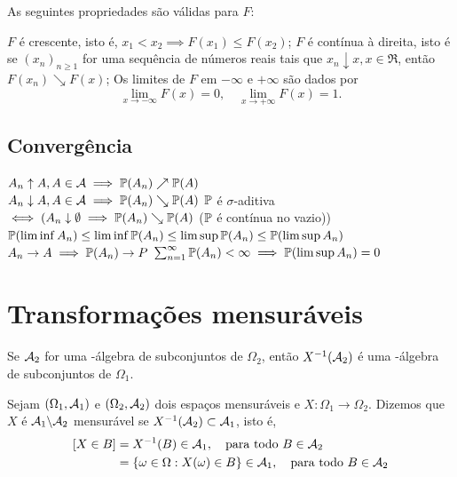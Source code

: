 \begin{theorem} As seguintes propriedades são válidas para $F$:
	\begin{outline}[enumerate]
		\1 $F$ é crescente, isto é, \(x_1<x_2 \implies F(x_1)\leq F(x_2)\);
		\1 $F$ é contínua à direita, isto é se $(x_n)_{n\geq1}$ for uma sequência de números reais tais que \(x_n\downarrow x, x\in \Re\), então \(F(x_n)\searrow F(x)\);
		\1 Os limites de $F$ em $-\infty$ e $+\infty$ são dados por
		\[
			\lim\limits_{x\to-\infty}F(x)=0, \quad \lim\limits_{x\to+\infty}F(x)=1.
		\]
	\end{outline}
\end{theorem}

\subsection{Convergência}

\begin{theorem}
	\leavevmode
	\begin{outline}[enumerate]
		\1 \( A_n \uparrow A, A \in \Acal \implies \P(A_n) \nearrow \P(A) \) \\
		\( A_n \downarrow A, A \in \Acal \implies \P(A_n) \searrow \P(A) \)
		\1 $\P$ é $\sigma$-aditiva $\iff (A_n\downarrow\emptyset \implies \P(A_n) \searrow \P(A)$ ($\P$ é contínua no vazio))
		\1 \( \P(\liminf A_n) \leq \liminf\P(A_n) \leq \limsup\P(A_n) \leq \P(\limsup A_n) \)
		\1 \( A_n \to A \implies \P(A_n)\to P\)
		\1 \(\sum_{n=1}^{\infty}\P(A_n)<\infty \implies \P(\limsup A_n)=0\)
	\end{outline}
\end{theorem}

\section{Transformações mensuráveis}

\begin{theorem}[2.1]
	Se $\Acal_2$ for uma \sig-álgebra de subconjuntos de $\Omega_2$, então $X\inv(\Acal_2)$ é uma \sig-álgebra de subconjuntos de $\Omega_1$.
\end{theorem}

\begin{definition}
	Sejam $(\Omega_1, \Acal_1)$ e $(\Omega_2, \Acal_2)$ dois espaços mensuráveis e $X\colon\Omega_1\to\Omega_2$. Dizemos que $X$ é $\Acal_1\backslash\Acal_2$ mensurável se $X\inv(\Acal_2) \subset \Acal_1$, isto é,
	\begin{equation}
		\begin{aligned}
			[X\in B] &= X\inv(B)\in\Acal_1, \quad \text{para todo } B \in \Acal_2 \\
		      	     &= \{\omega \in \Omega: X(\omega) \in B \}  \in \Acal_1,  \quad \text{para todo } B \in \Acal_2
		\end{aligned}
	\end{equation}
\end{definition}

